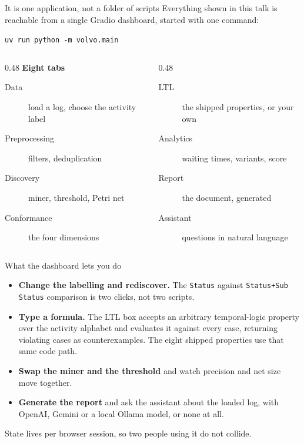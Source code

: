 \documentclass[aspectratio=169]{beamer}
\newcommand{\act}[1]{\texttt{\small #1}}
\begin{document}
\begin{frame}{It is one application, not a folder of scripts}
Everything shown in this talk is reachable from a single Gradio dashboard,
started with one command:
\bigskip
\begin{center}
\texttt{uv run python -m volvo.main}
\end{center}
\bigskip
\begin{columns}[T]
\begin{column}{0.48\textwidth}
\textbf{Eight tabs}
\begin{description}
  \item[Data] load a log, choose the activity label
  \item[Preprocessing] filters, deduplication
  \item[Discovery] miner, threshold, Petri net
  \item[Conformance] the four dimensions
\end{description}
\end{column}
\begin{column}{0.48\textwidth}
\textbf{\phantom{Eight tabs}}
\begin{description}
  \item[LTL] the shipped properties, or your own
  \item[Analytics] waiting times, variants, score
  \item[Report] the document, generated
  \item[Assistant] questions in natural language
\end{description}
\end{column}
\end{columns}
\end{frame}

\begin{frame}{What the dashboard lets you do}
\begin{itemize}
  \item \textbf{Change the labelling and rediscover.} The \act{Status} against
        \act{Status+Sub Status} comparison is two clicks, not two scripts.
  \item \textbf{Type a formula.} The LTL box accepts an arbitrary
        temporal-logic property over the activity alphabet and evaluates it
        against every case, returning violating cases as counterexamples. The
        eight shipped properties use that same code path.
  \item \textbf{Swap the miner and the threshold} and watch precision and net
        size move together.
  \item \textbf{Generate the report} and ask the assistant about the loaded log,
        with OpenAI, Gemini or a local Ollama model, or none at all.
\end{itemize}
\bigskip
State lives per browser session, so two people using it do not collide.
\end{frame}
\end{document}
